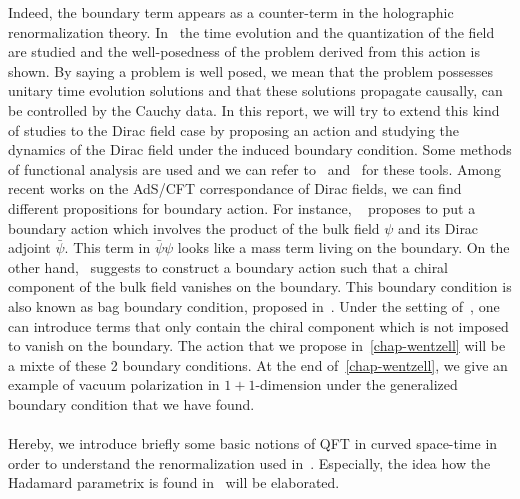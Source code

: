 Indeed, the boundary term appears as a counter-term in the holographic renormalization theory.
In~\cite{Zahn2016} the time evolution and the quantization of the field are studied and the well-posedness of the problem derived from this action is shown.
By saying a problem is well posed, we mean that the problem possesses unitary time evolution solutions and that these solutions propagate causally, \ie can be controlled by the Cauchy data.
In this report, we will try to extend this kind of studies to the Dirac field case by proposing an action and studying the dynamics of the Dirac field under the induced boundary condition.
Some methods of functional analysis are used and we can refer to~\cite{Reed1981} and~\cite{Reed1975} for these tools. 
%
Among recent works on the AdS/CFT correspondance of Dirac fields, we can find different propositions for boundary action.
For instance, 
~\cite{Henningson1998} proposes to put a boundary action which involves the product of the bulk field $\psi$ and its Dirac adjoint $\bar{\psi}$. 
This term in $\bar{\psi}\psi$ looks like a mass term living on the boundary.
On the other hand,~\cite{Contino2005} suggests to construct a boundary action such that a chiral component of the bulk field vanishes on the boundary.
This boundary condition is also known as bag boundary condition, proposed in~\cite{Chodos1974}.
Under the setting of~\cite{Contino2005}, one can introduce terms that only contain the chiral component which is not imposed to vanish on the boundary.
The action that we propose in~\cref{chap-wentzell} will be a mixte of these 2 boundary conditions.
At the end of~\cref{chap-wentzell}, we give an example of vacuum polarization in $1+1$-dimension under the generalized boundary condition that we have found.
\\\\
%
Hereby, we introduce briefly some basic notions of QFT in curved space-time in order to understand the renormalization used in~\cite{Zahn2015}.
Especially, the idea how the Hadamard parametrix is found in~\cite{Zahn2015} will be elaborated.
